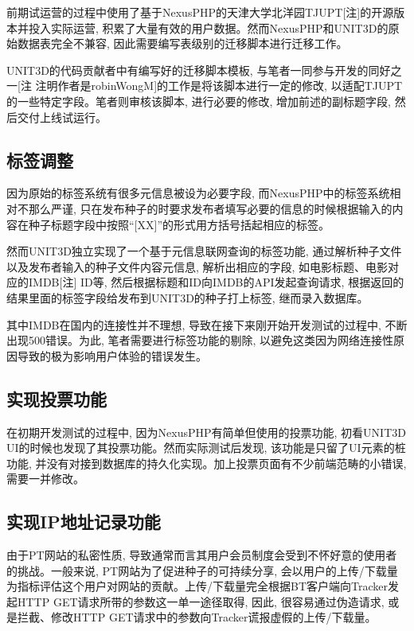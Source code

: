 前期试运营的过程中使用了基于NexusPHP的天津大学北洋园TJUPT[注]的开源版本并投入实际运营, 积累了大量有效的用户数据。然而NexusPHP和UNIT3D的原始数据表完全不兼容, 因此需要编写表级别的迁移脚本进行迁移工作。

UNIT3D的代码贡献者中有编写好的迁移脚本模板, 与笔者一同参与开发的同好之一[注 注明作者是robinWongM]的工作是将该脚本进行一定的修改, 以适配TJUPT的一些特定字段。笔者则审核该脚本, 进行必要的修改, 增加前述的副标题字段, 然后交付上线试运行。

\subsection{标签调整}

因为原始的标签系统有很多元信息被设为必要字段, 而NexusPHP中的标签系统相对不那么严谨, 只在发布种子的时要求发布者填写必要的信息的时候根据输入的内容在种子标题字段中按照``[XX]''的形式用方括号括起相应的标签。 

然而UNIT3D独立实现了一个基于元信息联网查询的标签功能, 通过解析种子文件以及发布者输入的种子文件内容元信息, 解析出相应的字段, 如电影标题、电影对应的IMDB[注] ID等, 然后根据标题和ID向IMDB的API发起查询请求, 根据返回的结果里面的标签字段给发布到UNIT3D的种子打上标签, 继而录入数据库。

其中IMDB在国内的连接性并不理想, 导致在接下来刚开始开发测试的过程中, 不断出现500错误。为此, 笔者需要进行标签功能的剔除, 以避免这类因为网络连接性原因导致的极为影响用户体验的错误发生。

\subsection{实现投票功能}

在初期开发测试的过程中, 因为NexusPHP有简单但使用的投票功能, 初看UNIT3D UI的时候也发现了其投票功能。然而实际测试后发现, 该功能是只留了UI元素的桩功能, 并没有对接到数据库的持久化实现。加上投票页面有不少前端范畴的小错误, 需要一并修改。

\subsection{实现IP地址记录功能}

由于PT网站的私密性质, 导致通常而言其用户会员制度会受到不怀好意的使用者的挑战。一般来说, PT网站为了促进种子的可持续分享, 会以用户的上传/下载量为指标评估这个用户对网站的贡献。上传/下载量完全根据BT客户端向Tracker发起HTTP GET请求所带的参数这一单一途径取得, 因此, 很容易通过伪造请求, 或是拦截、修改HTTP GET请求中的参数向Tracker谎报虚假的上传/下载量。

